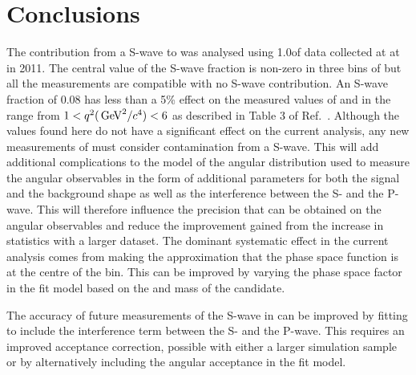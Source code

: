 \section{Conclusions}

The contribution from a \kpi S-wave to \BdToKstmm was analysed using 1.0\invfb of data collected at \lhcb at \tev in 2011. 
The central value of the S-wave fraction is non-zero in three bins of \qsq but all the measurements are compatible with no S-wave contribution.
An S-wave fraction of 0.08 has less than a 5\% effect on the measured values of \AFB and \FL in the range from $1<q^2(\mathrm{\,Ge\kern -0.1em V}^{2} / c^{4} )<6$ as described in Table 3 of Ref.~\cite{Aaij:2013iag}.
Although the values found here do not have a significant effect on the current analysis, any new measurements of \BdToKstmm must consider contamination from a \kpi S-wave.
This will add additional complications to the model of the angular distribution used to measure the angular observables in the form of additional parameters for both the signal and the background \kpi shape
as well as the interference between the S- and the P-wave.
This will therefore influence the precision that can be obtained on the angular observables and reduce the improvement gained from the increase in statistics with a larger dataset.
The dominant systematic effect in the current analysis comes from making the approximation that the phase space function is at the centre of the \qsq bin.
This can be improved by varying the phase space factor in the fit model based on the \qsq and \B mass of the \BdToKpimm candidate.

The accuracy of future measurements of the \kpi S-wave in \BdToKpimm can be improved by fitting \ctk to include the interference term between the S- and the P-wave.
This requires an improved acceptance correction, possible with either a larger simulation sample or by alternatively including the angular acceptance in the fit model.


